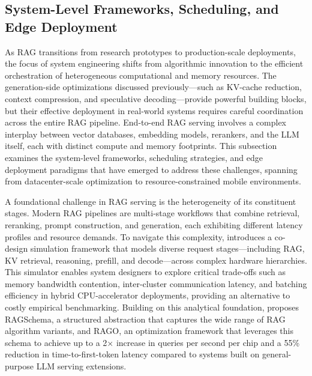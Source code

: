 \documentclass[11pt]{article}
\begin{document}
\subsection{System-Level Frameworks, Scheduling, and Edge Deployment}

As RAG transitions from research prototypes to production-scale deployments, the focus of system engineering shifts from algorithmic innovation to the efficient orchestration of heterogeneous computational and memory resources. The generation-side optimizations discussed previously---such as KV-cache reduction, context compression, and speculative decoding---provide powerful building blocks, but their effective deployment in real-world systems requires careful coordination across the entire RAG pipeline. End-to-end RAG serving involves a complex interplay between vector databases, embedding models, rerankers, and the LLM itself, each with distinct compute and memory footprints. This subsection examines the system-level frameworks, scheduling strategies, and edge deployment paradigms that have emerged to address these challenges, spanning from datacenter-scale optimization to resource-constrained mobile environments.

A foundational challenge in RAG serving is the heterogeneity of its constituent stages. Modern RAG pipelines are multi-stage workflows that combine retrieval, reranking, prompt construction, and generation, each exhibiting different latency profiles and resource demands. To navigate this complexity, \cite{ref536} introduces a co-design simulation framework that models diverse request stages---including RAG, KV retrieval, reasoning, prefill, and decode---across complex hardware hierarchies. This simulator enables system designers to explore critical trade-offs such as memory bandwidth contention, inter-cluster communication latency, and batching efficiency in hybrid CPU-accelerator deployments, providing an alternative to costly empirical benchmarking. Building on this analytical foundation, \cite{ref517} proposes RAGSchema, a structured abstraction that captures the wide range of RAG algorithm variants, and RAGO, an optimization framework that leverages this schema to achieve up to a 2× increase in queries per second per chip and a 55\% reduction in time-to-first-token latency compared to systems built on general-purpose LLM serving extensions.
\end{document}
